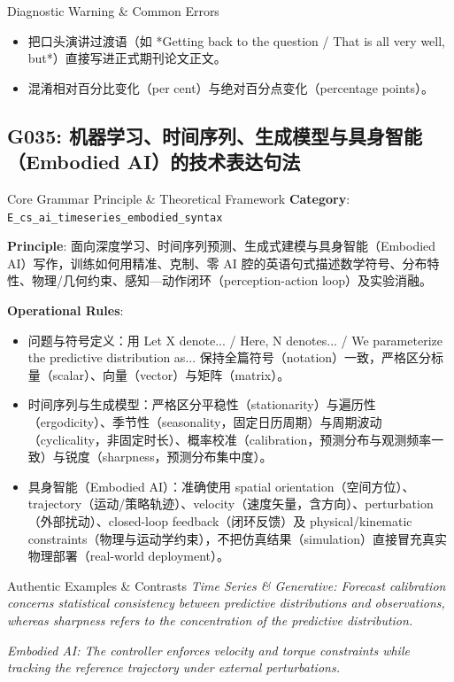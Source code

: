 \begin{TipBox}{Diagnostic Warning \& Common Errors}
\begin{itemize}[leftmargin=1.5em, itemsep=1pt]
  \item 把口头演讲过渡语（如 *Getting back to the question / That is all very well, but*）直接写进正式期刊论文正文。
  \item 混淆相对百分比变化（per cent）与绝对百分点变化（percentage points）。
\end{itemize}
\end{TipBox}
\vspace{6pt}
\subsection{G035: 机器学习、时间序列、生成模型与具身智能（Embodied AI）的技术表达句法}\label{sec:rule:G035}
\begin{ConceptBox}{Core Grammar Principle \& Theoretical Framework}
\textbf{Category}: \texttt{E\_cs\_ai\_timeseries\_embodied\_syntax}\par\vspace{3pt}
\textbf{Principle}: 面向深度学习、时间序列预测、生成式建模与具身智能（Embodied AI）写作，训练如何用精准、克制、零 AI 腔的英语句式描述数学符号、分布特性、物理/几何约束、感知---动作闭环（perception-action loop）及实验消融。\par\vspace{4pt}
\textbf{Operational Rules}:
\begin{itemize}[leftmargin=1.5em, itemsep=1pt]
  \item 问题与符号定义：用 Let X denote... / Here, N denotes... / We parameterize the predictive distribution as... 保持全篇符号（notation）一致，严格区分标量（scalar）、向量（vector）与矩阵（matrix）。
  \item 时间序列与生成模型：严格区分平稳性（stationarity）与遍历性（ergodicity）、季节性（seasonality，固定日历周期）与周期波动（cyclicality，非固定时长）、概率校准（calibration，预测分布与观测频率一致）与锐度（sharpness，预测分布集中度）。
  \item 具身智能（Embodied AI）：准确使用 spatial orientation（空间方位）、trajectory（运动/策略轨迹）、velocity（速度矢量，含方向）、perturbation（外部扰动）、closed-loop feedback（闭环反馈）及 physical/kinematic constraints（物理与运动学约束），不把仿真结果（simulation）直接冒充真实物理部署（real-world deployment）。
\end{itemize}
\end{ConceptBox}
\begin{ExampleBox}{Authentic Examples \& Contrasts}
\textit{Time Series \& Generative: Forecast calibration concerns statistical consistency between predictive distributions and observations, whereas sharpness refers to the concentration of the predictive distribution.}\par\vspace{2pt}
\textit{Embodied AI: The controller enforces velocity and torque constraints while tracking the reference trajectory under external perturbations.}\par\vspace{2pt}
\end{ExampleBox}
